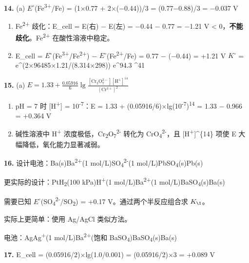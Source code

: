 \textbf{14.}
(a) \(E^{\circ}\)(Fe\textsuperscript{3+}/Fe) = (1×0.77 + 2×(−0.44))/3 = (0.77−0.88)/3 = −0.037 V

\begin{enumerate}
\def\labelenumi{(\alph{enumi})}
\setcounter{enumi}{1}
\item
  Fe\textsuperscript{2+} 歧化：E\_cell = E(右) − E(左) = −0.44 − 0.77 = −1.21 V \textless{} 0，\textbf{不能歧化}。Fe\textsuperscript{2+} 在酸性溶液中稳定。
\item
  E\_cell = \(E^{\circ}\)(Fe\textsuperscript{3+}/Fe\textsuperscript{2+}) − \(E^{\circ}\)(Fe\textsuperscript{2+}/Fe) = 0.77 − (−0.44) = +1.21 V
  \(K^{\circ}\) = e\^{}(2×96485×1.21/(8.314×298))  e\^{}94.3 \^{}41
\end{enumerate}

\textbf{15.}
(a) \(E = 1.33 + \frac{0.05916}{6}\lg\frac{[\mathrm{Cr_2O_7^{2-}}][\mathrm{H^+}]^{14}}{[\mathrm{Cr^{3+}}]^2}\)

\begin{enumerate}
\def\labelenumi{(\alph{enumi})}
\setcounter{enumi}{1}
\item
  pH = 7 时 {[}H\textsuperscript{+}{]} = 10\textsuperscript{-7}：E = 1.33 + (0.05916/6)×lg(10\textsuperscript{-7})\textsuperscript{14} = 1.33 − 0.966 = +0.364 V
\item
  碱性溶液中 H\textsuperscript{+} 浓度极低，Cr\textsubscript{2}O\textsubscript{7}\textsuperscript{2-} 转化为 CrO\textsubscript{4}\textsuperscript{2-}，且 {[}H\textsuperscript{+}{]}\^{}\{14\} 项使 E 大幅降低，氧化能力显著减弱。
\end{enumerate}

\textbf{16.} 设计电池：Ba(s)\textbar Ba\textsuperscript{2+}(1 mol/L)\textbar\textbar SO\textsubscript{4}\textsuperscript{2-}(1 mol/L)\textbar PbSO\textsubscript{4}(s)\textbar Pb(s)

更实际的设计：Pt\textbar H\textsubscript{2}(100 kPa)\textbar H\textsuperscript{+}(1 mol/L)\textbar\textbar Ba\textsuperscript{2+}(1 mol/L)\textbar BaSO\textsubscript{4}(s)\textbar Ba(s)

需要已知 \(E^{\circ}\)(SO\textsubscript{4}\textsuperscript{2-}/SO\textsubscript{2}) = +0.17 V。通过两个半反应组合求 \(K_{\1}\)。

实际上更简单：使用 Ag/AgCl 类似方法。

电池：Ag\textbar Ag\textsuperscript{+}(1 mol/L)\textbar\textbar Ba\textsuperscript{2+}(饱和 BaSO\textsubscript{4})\textbar BaSO\textsubscript{4}(s)\textbar Ba(s)

\textbf{17.} E\_cell = (0.05916/2)×lg(1.0/0.001) = (0.05916/2)×3 = +0.089 V

